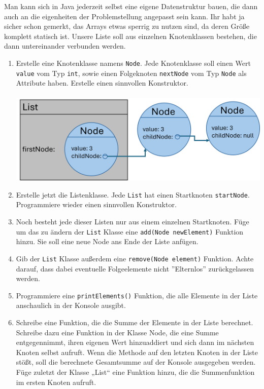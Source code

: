 \documentclass{../../sheet}
\begin{document}
\newpage
{}
Man kann sich in Java jederzeit selbst eine eigene Datenstruktur bauen, die dann auch an die eigenheiten der Problemstellung angepasst sein kann. Ihr habt ja sicher schon gemerkt, das Arrays etwas sperrig zu nutzen sind, da deren Größe komplett statisch ist. Unsere Liste soll aus einzelnen Knotenklassen bestehen, die dann untereinander verbunden werden.
\begin{enumerate}
    \item Erstelle eine Knotenklasse namens \texttt{Node}. Jede Knotenklasse soll einen Wert \texttt{value} vom Typ \texttt{int}, sowie einen Folgeknoten \texttt{nextNode} vom Typ \texttt{Node} als Attribute haben. Erstelle einen sinnvollen Konstruktor.\\\\
    \includegraphics[width=\linewidth]{img/linkedlist.png}
    \item Erstelle jetzt die Listenklasse. Jede \texttt{List} hat einen Startknoten \texttt{startNode}. Programmiere wieder einen sinnvollen Konstruktor.
    \item Noch besteht jede dieser Listen nur aus einem einzelnen Startknoten. Füge um das zu ändern der \texttt{List} Klasse eine \texttt{add(Node newElement)} Funktion hinzu. Sie soll eine neue Node ans Ende der Liste anfügen. 
    \item Gib der \texttt{List} Klasse außerdem eine \texttt{remove(Node element)} Funktion. Achte darauf, dass dabei eventuelle Folgeelemente nicht ''Elternlos'' zurückgelassen werden. 
    \item Programmiere eine \texttt{printElements()} Funktion, die alle Elemente in der Liste anschaulich in der Konsole ausgibt.
    \item Schreibe eine Funktion, die die Summe der Elemente in der Liste berechnet. Schreibe dazu eine Funktion in der Klasse Node, die eine Summe entgegennimmt, ihren eigenen Wert hinzuaddiert und sich dann im nächsten Knoten selbst aufruft. Wenn die Methode auf den letzten Knoten in der Liste stößt, soll die berechnete Gesamtsumme auf der Konsole ausgegeben werden. Füge zuletzt der Klasse „List“ eine Funktion hinzu, die die Summenfunktion im ersten Knoten aufruft.
\end{enumerate}
\end{document}
